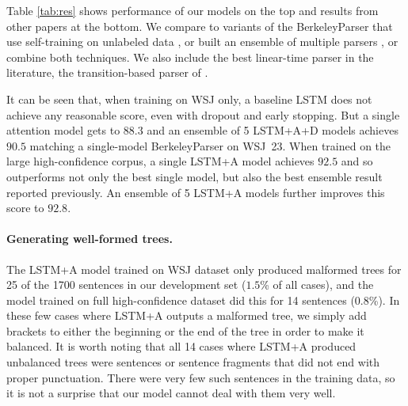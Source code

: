 \documentclass{article} \usepackage{nips15submit_e,times}
\newcommand\citet\cite
\newcommand\citep\cite
\begin{document}
Table \ref{tab:res} shows performance of our models on the top and results
from other papers at the bottom.
We compare to variants of the BerkeleyParser that use
self-training on unlabeled data \citep{huang-harper:2009:EMNLP}, or built an ensemble
of multiple parsers \citep{petrov:2010:NAACL}, or combine both techniques.
We also include the best linear-time parser in the literature,
the transition-based parser of \citet{zhu-EtAl:2013:ACL}.

It can be seen that, when training on WSJ only, a baseline LSTM does not
achieve any reasonable score, even with dropout and early stopping.
But a single attention model gets to $88.3$ and an ensemble of 5 LSTM+A+D models
achieves $90.5$ matching a single-model BerkeleyParser on WSJ~23.
When trained on the large high-confidence corpus, a single LSTM+A model
achieves $92.5$ and so outperforms not only the best single model, but also
the best ensemble result reported previously. An ensemble of 5 LSTM+A models
further improves this score to $92.8$.

\paragraph{Generating well-formed trees.}
The LSTM+A model trained on WSJ dataset only produced malformed trees
for 25 of the 1700 sentences in our development set ($1.5$\% of all cases),
and the model trained on full high-confidence dataset did this for 14
sentences ($0.8$\%). In these few cases where LSTM+A outputs a malformed tree,
we simply add brackets to either the beginning or the end of the tree
in order to make it balanced. It is worth noting that all 14 cases where
LSTM+A produced unbalanced trees were sentences or sentence fragments that did not
end with proper punctuation. There were very few such sentences in the training data,
so it is not a surprise that our model cannot deal with them very well.
\end{document}

